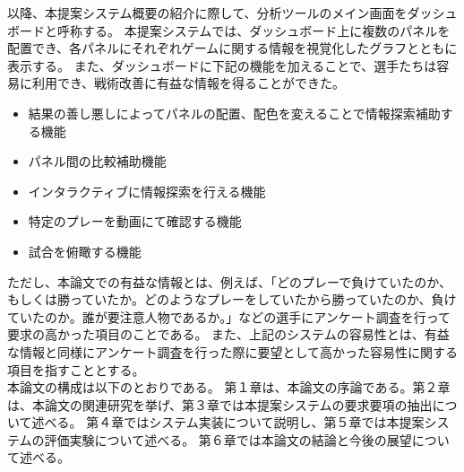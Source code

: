 \documentclass[sotsuron]{kuee}
\begin{document}
以降、本提案システム概要の紹介に際して、分析ツールのメイン画面をダッシュボードと呼称する。
本提案システムでは、ダッシュボード上に複数のパネルを配置でき、各パネルにそれぞれゲームに関する情報を視覚化したグラフとともに表示する。
また、ダッシュボードに下記の機能を加えることで、選手たちは容易に利用でき、戦術改善に有益な情報を得ることができた。
	\begin{itemize}
		\item 結果の善し悪しによってパネルの配置、配色を変えることで情報探索補助する機能
		\item パネル間の比較補助機能
		\item インタラクティブに情報探索を行える機能
		\item 特定のプレーを動画にて確認する機能
		\item 試合を俯瞰する機能
	\end{itemize}
ただし、本論文での有益な情報とは、例えば、「どのプレーで負けていたのか、もしくは勝っていたか。どのようなプレーをしていたから勝っていたのか、負けていたのか。誰が要注意人物であるか。」などの選手にアンケート調査を行って要求の高かった項目のことである。
また、上記のシステムの容易性とは、有益な情報と同様にアンケート調査を行った際に要望として高かった容易性に関する項目を指すこととする。
\\本論文の構成は以下のとおりである。
第１章は、本論文の序論である。第２章は、本論文の関連研究を挙げ、第３章では本提案システムの要求要項の抽出について述べる。
第４章ではシステム実装について説明し、第５章では本提案システムの評価実験について述べる。
第６章では本論文の結論と今後の展望について述べる。


\end{document}
